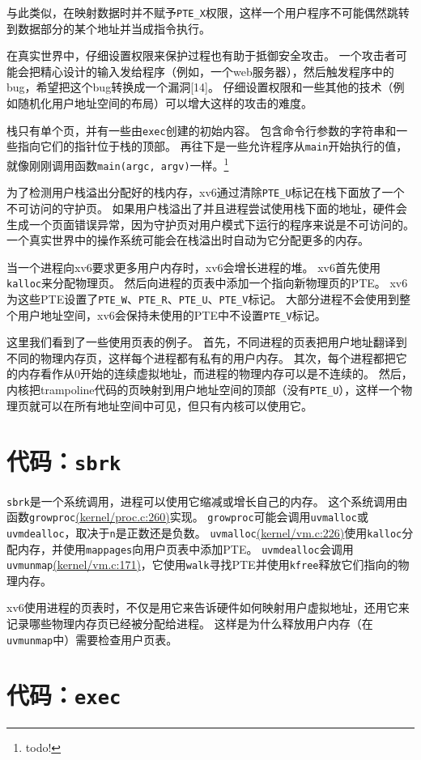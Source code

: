 与此类似，在映射数据时并不赋予\texttt{PTE\_X}权限，这样一个用户程序不可能偶然跳转到数据部分的某个地址并当成指令执行。

在真实世界中，仔细设置权限来保护过程也有助于抵御安全攻击。
一个攻击者可能会把精心设计的输入发给程序（例如，一个web服务器），然后触发程序中的bug，希望把这个bug转换成一个漏洞[14]。
仔细设置权限和一些其他的技术（例如随机化用户地址空间的布局）可以增大这样的攻击的难度。

栈只有单个页，并有一些由\texttt{exec}创建的初始内容。
包含命令行参数的字符串和一些指向它们的指针位于栈的顶部。
再往下是一些允许程序从\texttt{main}开始执行的值，就像刚刚调用函数\texttt{main(argc, argv)}一样。\footnote{todo!}

为了检测用户栈溢出分配好的栈内存，xv6通过清除\texttt{PTE\_U}标记在栈下面放了一个不可访问的守护页。
如果用户栈溢出了并且进程尝试使用栈下面的地址，硬件会生成一个页面错误异常，因为守护页对用户模式下运行的程序来说是不可访问的。
一个真实世界中的操作系统可能会在栈溢出时自动为它分配更多的内存。

当一个进程向xv6要求更多用户内存时，xv6会增长进程的堆。
xv6首先使用\texttt{kalloc}来分配物理页。
然后向进程的页表中添加一个指向新物理页的PTE。
xv6为这些PTE设置了\texttt{PTE\_W}、\texttt{PTE\_R}、\texttt{PTE\_U}、\texttt{PTE\_V}标记。
大部分进程不会使用到整个用户地址空间，xv6会保持未使用的PTE中不设置\texttt{PTE\_V}标记。

这里我们看到了一些使用页表的例子。
首先，不同进程的页表把用户地址翻译到不同的物理内存页，这样每个进程都有私有的用户内存。
其次，每个进程都把它的内存看作从0开始的连续虚拟地址，而进程的物理内存可以是不连续的。
然后，内核把trampoline代码的页映射到用户地址空间的顶部（没有\texttt{PTE\_U}），这样一个物理页就可以在所有地址空间中可见，但只有内核可以使用它。

\section{代码：\texttt{sbrk}}
\texttt{sbrk}是一个系统调用，进程可以使用它缩减或增长自己的内存。
这个系统调用由函数\texttt{growproc}\href{https://github.com/mit-pdos/xv6-riscv/blob/riscv//kernel/proc.c#L260}{(kernel/proc.c:260)}实现。
\texttt{growproc}可能会调用\texttt{uvmalloc}或\texttt{uvmdealloc}，取决于\texttt{n}是正数还是负数。
\texttt{uvmalloc}\href{https://github.com/mit-pdos/xv6-riscv/blob/riscv//kernel/vm.c#L226}{(kernel/vm.c:226)}使用\texttt{kalloc}分配内存，并使用\texttt{mappages}向用户页表中添加PTE。
\texttt{uvmdealloc}会调用\texttt{uvmunmap}\href{https://github.com/mit-pdos/xv6-riscv/blob/riscv//kernel/vm.c#L171}{(kernel/vm.c:171)}，它使用\texttt{walk}寻找PTE并使用\texttt{kfree}释放它们指向的物理内存。

xv6使用进程的页表时，不仅是用它来告诉硬件如何映射用户虚拟地址，还用它来记录哪些物理内存页已经被分配给进程。
这样是为什么释放用户内存（在\texttt{uvmunmap}中）需要检查用户页表。

\section{代码：\texttt{exec}}



